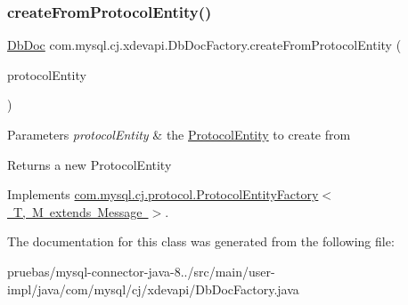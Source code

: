 \subsubsection{\texorpdfstring{create\+From\+Protocol\+Entity()}{createFromProtocolEntity()}}
{\footnotesize\ttfamily \mbox{\hyperlink{interfacecom_1_1mysql_1_1cj_1_1xdevapi_1_1_db_doc}{Db\+Doc}} com.\+mysql.\+cj.\+xdevapi.\+Db\+Doc\+Factory.\+create\+From\+Protocol\+Entity (\begin{DoxyParamCaption}\item[{\mbox{\hyperlink{interfacecom_1_1mysql_1_1cj_1_1protocol_1_1_protocol_entity}{Protocol\+Entity}}}]{protocol\+Entity }\end{DoxyParamCaption})}


\begin{DoxyParams}{Parameters}
{\em protocol\+Entity} & the \mbox{\hyperlink{}{Protocol\+Entity}} to create from \\
\hline
\end{DoxyParams}
\begin{DoxyReturn}{Returns}
a new Protocol\+Entity 
\end{DoxyReturn}


Implements \mbox{\hyperlink{interfacecom_1_1mysql_1_1cj_1_1protocol_1_1_protocol_entity_factory_a282b14fecc86c7202cd9361333235ef8}{com.\+mysql.\+cj.\+protocol.\+Protocol\+Entity\+Factory$<$ T, M extends Message $>$}}.



The documentation for this class was generated from the following file\+:\begin{DoxyCompactItemize}
\item 
pruebas/mysql-\/connector-\/java-\/8../src/main/user-\/impl/java/com/mysql/cj/xdevapi/Db\+Doc\+Factory.\+java\end{DoxyCompactItemize}
